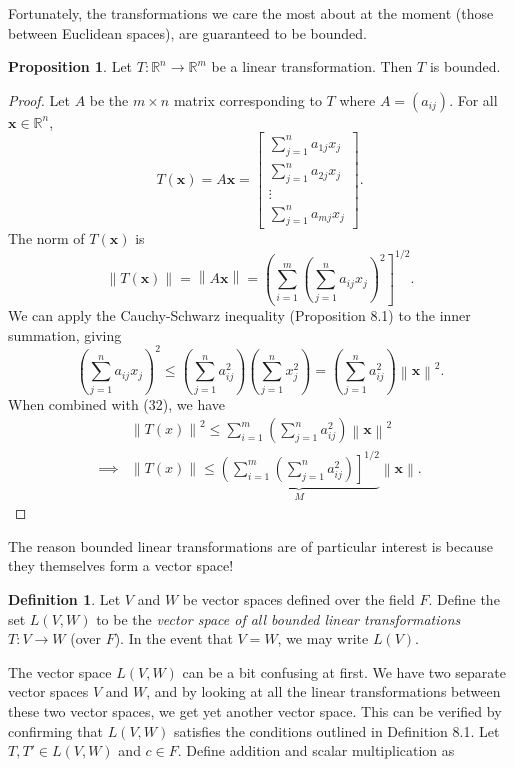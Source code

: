 \documentclass{article}
\newcommand{\R}{\mathbb{R}}
\newcommand{\x}{\mathbf{x}}
\newcommand{\norm}[1]{\left\lVert#1\right\rVert}
\theoremstyle{definition}
\newtheorem{proposition}{Proposition}[section]
\newtheorem{definition}{Definition}[section]
\begin{document}
	Fortunately, the transformations we care the most about at the moment (those between Euclidean spaces), are guaranteed to be bounded.
	\begin{proposition}
		Let $ T:\R^n\to\R^m $ be a linear transformation. Then $ T $ is bounded. 
	\end{proposition}
	\begin{proof}
		Let $ A $ be the $ m\times n $ matrix corresponding to $ T $ where $ A = (a_{ij}) $. For all $ \x\in \R^n $, $$ T(\x) = A\x = \begin{bmatrix}
			\sum_{j=1}^{n}a_{1j}x_j\\
			\sum_{j=1}^{n}a_{2j}x_j\\\vdots \\ 
			\sum_{j=1}^{n}a_{mj}x_j
		\end{bmatrix} .$$
		The norm of $ T(\x) $ is 
		\begin{equation}\label{key}
			\norm{T(\x)} = \norm{A\x} =\left( \sum_{i=1}^{m}\left(\sum_{j=1}^{n}a_{ij}x_j\right)^2\right]^{1/2} .
		\end{equation}
		We can apply the Cauchy-Schwarz inequality (Proposition 8.1) to the inner summation, giving 
		$$ \left(\sum_{j=1}^{n}a_{ij}x_j\right)^2 \le \left(\sum_{j=1}^{n}a_{ij}^2\right) \left(\sum_{j=1}^{n}x_j^2\right)= \left(\sum_{j=1}^{n}a_{ij}^2\right) \norm{\x}^2 .$$ When combined with (32), we have 
		\begin{align*}
			&\norm{T(x)} ^2\le  \sum_{i=1}^{m} \left(\sum_{j=1}^{n}a_{ij}^2\right)\norm{\x}^2\\
			\implies& \norm{T(x)} \le \underbrace{\left( \sum_{i=1}^{m} \left(\sum_{j=1}^{n}a_{ij}^2\right)\right]^{1/2}}_M\norm{\x} .
		\end{align*}
	\end{proof}
	The reason bounded linear transformations are of particular interest is because they themselves form a vector space!
	\begin{definition}\label{def8.10}
		Let $ V $ and $ W $ be vector spaces defined over the field $ F $. Define the set $ L(V,W) $ to be the \textit{\color{red}vector space of all bounded linear transformations} $ T:V\to W $ (over $ F $). In the event that $ V =W $, we may write $ L(V) $. 
	\end{definition}
	The vector space $ L(V,W) $ can be a bit confusing at first. We have two separate vector spaces $ V $ and $ W $, and by looking at all the linear transformations between these two vector spaces, we get yet another vector space. This can be verified by confirming that $ L(V,W) $ satisfies the conditions outlined in Definition 8.1. Let $ T,T'\in L(V,W) $ and $ c\in F $. Define addition and scalar multiplication as 
\end{document}
